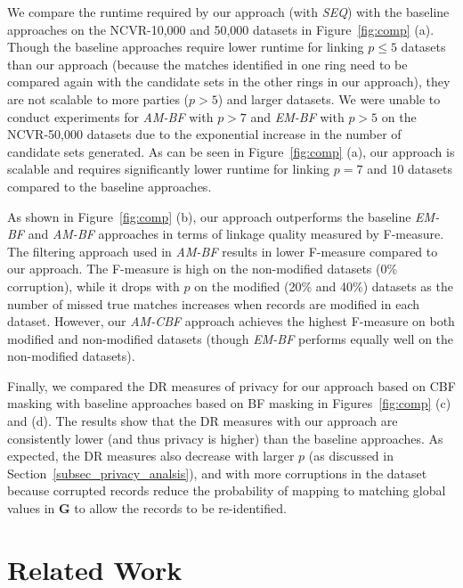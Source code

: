 \documentclass{sig-alternate}
\begin{document}
We compare the runtime required by our approach (with \emph{SEQ})
with the baseline approaches 
on the NCVR-10,000 and 50,000 datasets in Figure~\ref{fig:comp} (a).
Though the baseline approaches 
require lower runtime for linking $p \le 5$ 
datasets than our approach (because the matches
identified in one ring need to be compared again
with the candidate sets in the other rings in our approach), 
they are not scalable to more parties ($p > 5$) and larger datasets.
We were unable to conduct experiments for \emph{AM-BF}
with $p > 7$ and \emph{EM-BF} with $p > 5$ on the NCVR-50,000
datasets due to the exponential increase in the number of candidate sets
generated.
As can be seen in Figure~\ref{fig:comp} (a), 
our approach is scalable and requires significantly lower runtime 
for linking $p=7$ and $10$ datasets compared to the baseline
approaches.

As shown in Figure~\ref{fig:comp} (b), our approach outperforms
the baseline \emph{EM-BF} and \emph{AM-BF}
approaches in terms of linkage quality measured by F-measure.
The filtering approach used in \emph{AM-BF} results in lower
F-measure compared to our approach.
The F-measure is high on the non-modified datasets (0\% corruption),
while it drops with $p$ on the modified (20\% and 40\%)
datasets as the number of missed true matches
increases when records are modified in each dataset.
However, our \emph{AM-CBF} approach achieves the highest 
F-measure on both modified and non-modified datasets
(though \emph{EM-BF} 
performs equally well 
on the non-modified
datasets).

Finally, we compared the DR measures
of privacy for our approach based on
CBF masking with 
baseline approaches based on
BF masking in Figures~\ref{fig:comp} (c) and (d).
The results show that the DR measures 
with our approach 
are consistently lower (and thus privacy
is higher) than the baseline
approaches. 
As expected, the DR measures also decrease with 
larger $p$ (as discussed in Section~\ref{subsec_privacy_analsis}),  
and with more corruptions in the dataset because corrupted
records reduce the probability of mapping to matching
global values in $\mathbf{G}$ to allow the records
to be re-identified.


\section{Related Work}
\label{sec-related}
\end{document}
